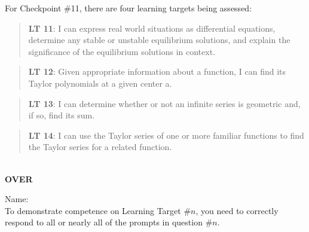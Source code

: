 \documentclass[11 pt]{article}
\begin{document}
 For Checkpoint \#11, there are four learning targets being assessed: 


\begin{quote}
{\bf LT 11}:  I can express real world situations as differential equations, determine any stable or unstable equilibrium solutions, and explain the significance of the equilibrium solutions in context.
\end{quote}

\begin{quote}
{\bf LT 12}:  Given appropriate information about a function, I can find its Taylor polynomials at a given center a.
\end{quote}

\begin{quote}
{\bf LT 13}:  I can determine whether or not an infinite series is geometric and, if so, find its sum.
\end{quote}

\begin{quote}
{\bf LT 14}: I can use the Taylor series of one or more familiar functions to find the Taylor series for a related function.
\end{quote}

\noindent \hrulefill \\

\vfill \hfill {\bf OVER} 

\pagebreak

\noindent Name: \\ 

\noindent To demonstrate competence on Learning Target \#$n$, you need to correctly respond to all or nearly all of the prompts in question \#$n$.  
\end{document}
